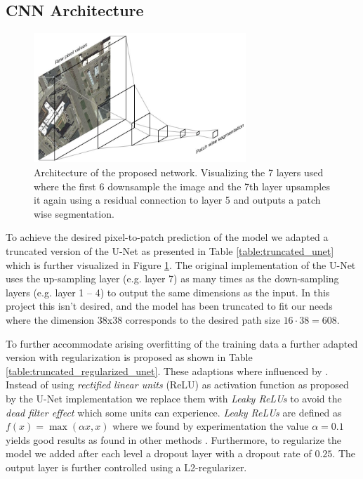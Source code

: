 \documentclass[10pt,conference,compsocconf]{IEEEtran}
\begin{document}
\subsection{CNN Architecture}\label{architectures}

\begin{figure}
\includegraphics[width={8cm}]{network-visualisation}
\caption{Architecture of the proposed network. Visualizing the 7 layers used where the first 6 downsample the image and the 7th layer upsamples it again using a residual connection to layer 5 and outputs a patch wise segmentation.}
\label{fig:architecture}
\end{figure}

To achieve the desired pixel-to-patch prediction of the model we adapted a truncated version of the U-Net \cite{Ronneberger2015} as presented in Table \ref{table:truncated_unet} which is further visualized in Figure \ref{fig:architecture}. The original implementation of the U-Net uses the up-sampling layer (e.g. layer 7) as many times as the down-sampling layers (e.g. layer 1 – 4) to output the same dimensions as the input. In this project this isn't desired, and the model has been truncated to fit our needs where the dimension 38x38 corresponds to the desired path size $16 \cdot 38 = 608$.

To further accommodate arising overfitting of the training data a further adapted version with regularization is proposed as shown in Table \ref{table:truncated_regularized_unet}. These adaptions where influenced by \cite{Pavllo2017}. Instead of using \textit{rectified linear units} (ReLU) as activation function as proposed by the U-Net implementation \cite{Ronneberger2015} we replace them with \textit{Leaky ReLUs} to avoid the \textit{dead filter effect} which some units can experience. \textit{Leaky ReLUs} are defined as $f(x) = \max(\alpha x, x)$ where we found by experimentation the value $\alpha=0.1$ yields good results as found in other methods \cite{Pavllo2017}. Furthermore, to regularize the model we added after each level a dropout layer with a dropout rate of $0.25$. The output layer is further controlled using a L2-regularizer.
\end{document}
